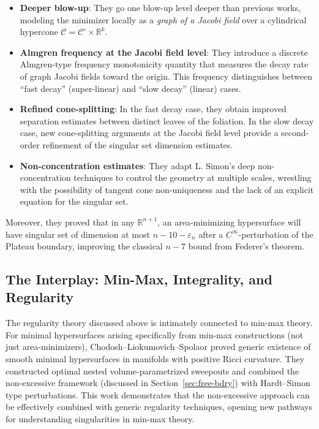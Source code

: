 \begin{itemize}
    \item \textbf{Deeper blow-up}: They go one blow-up level deeper than previous works, modeling
    the minimizer locally as a \emph{graph of a Jacobi field} over a cylindrical hypercone
    $\mathcal{C} = \mathcal{C}^\circ \times \mathbb{R}^k$.

    \item \textbf{Almgren frequency at the Jacobi field level}: They introduce a discrete
    Almgren-type frequency monotonicity quantity that measures the decay rate of graph Jacobi fields
    toward the origin. This frequency distinguishes between ``fast decay'' (super-linear) and ``slow
    decay'' (linear) cases.

    \item \textbf{Refined cone-splitting}: In the fast decay case, they obtain improved separation
    estimates between distinct leaves of the foliation. In the slow decay case, new cone-splitting
    arguments at the Jacobi field level provide a second-order refinement of the singular set
    dimension estimates.

    \item \textbf{Non-concentration estimates}: They adapt L. Simon's deep non-concentration
    techniques \cite{Sim93,Sim94} to control the geometry at multiple scales, wrestling with the
    possibility of tangent cone non-uniqueness and the lack of an explicit equation for the singular
    set.
\end{itemize}

Moreover, they proved that in any $\mathbb{R}^{n+1}$, an area-minimizing hypersurface will have
singular set of dimension at most $n - 10 - \varepsilon_n$ after a $C^\infty$-perturbation of the
Plateau boundary, improving the classical $n-7$ bound from Federer's theorem.

\subsection{The Interplay: Min-Max, Integrality, and Regularity}

The regularity theory discussed above is intimately connected to min-max theory. For minimal
hypersurfaces arising specifically from min-max constructions (not just area-minimizers),
Chodosh--Liokumovich--Spolaor \cite{CLS20} proved generic existence of smooth minimal hypersurfaces
in manifolds with positive Ricci curvature. They constructed optimal nested volume-parametrized
sweepouts and combined the non-excessive framework (discussed in Section~\ref{sec:free-bdry}) with
Hardt--Simon type perturbations. This work demonstrates that the non-excessive approach can be
effectively combined with generic regularity techniques, opening new pathways for understanding
singularities in min-max theory.


